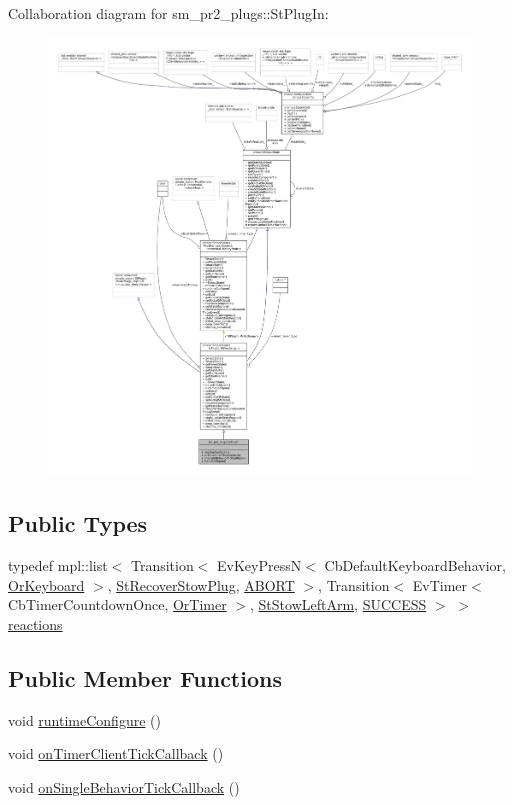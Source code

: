 Collaboration diagram for sm\+\_\+pr2\+\_\+plugs\+:\+:St\+Plug\+In\+:
\nopagebreak
\begin{figure}[H]
\begin{center}
\leavevmode
\includegraphics[width=350pt]{structsm__pr2__plugs_1_1StPlugIn__coll__graph}
\end{center}
\end{figure}
\subsection*{Public Types}
\begin{DoxyCompactItemize}
\item 
typedef mpl\+::list$<$ Transition$<$ Ev\+Key\+PressN$<$ Cb\+Default\+Keyboard\+Behavior, \hyperlink{classsm__pr2__plugs_1_1OrKeyboard}{Or\+Keyboard} $>$, \hyperlink{structsm__pr2__plugs_1_1StRecoverStowPlug}{St\+Recover\+Stow\+Plug}, \hyperlink{classABORT}{A\+B\+O\+RT} $>$, Transition$<$ Ev\+Timer$<$ Cb\+Timer\+Countdown\+Once, \hyperlink{classsm__pr2__plugs_1_1OrTimer}{Or\+Timer} $>$, \hyperlink{structsm__pr2__plugs_1_1StStowLeftArm}{St\+Stow\+Left\+Arm}, \hyperlink{classSUCCESS}{S\+U\+C\+C\+E\+SS} $>$ $>$ \hyperlink{structsm__pr2__plugs_1_1StPlugIn_a8af73855d8085eb54ef4052001a783d4}{reactions}
\end{DoxyCompactItemize}
\subsection*{Public Member Functions}
\begin{DoxyCompactItemize}
\item 
void \hyperlink{structsm__pr2__plugs_1_1StPlugIn_a21411a3a1c4fa85a7bad312cf01b0d9a}{runtime\+Configure} ()
\item 
void \hyperlink{structsm__pr2__plugs_1_1StPlugIn_a1748462c4026a2df5be52e38a429560b}{on\+Timer\+Client\+Tick\+Callback} ()
\item 
void \hyperlink{structsm__pr2__plugs_1_1StPlugIn_a6206766ae01ea5ee0effe3f574245176}{on\+Single\+Behavior\+Tick\+Callback} ()
\end{DoxyCompactItemize}
